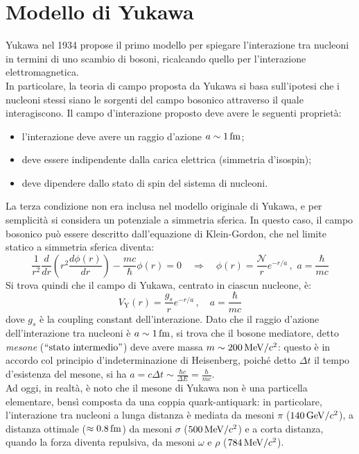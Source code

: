 
\section{Modello di Yukawa}

Yukawa nel 1934 propose il primo modello per spiegare l'interazione tra nucleoni in termini di uno scambio di bosoni, ricalcando quello per l'interazione elettromagnetica.\\
In particolare, la teoria di campo proposta da Yukawa si basa sull'ipotesi che i nucleoni stessi siano le sorgenti del campo bosonico attraverso il quale interagiscono. Il campo d'interazione proposto deve avere le seguenti proprietà:
\begin{itemize}
	\item l'interazione deve avere un raggio d'azione $ a \sim 1\,\mathrm{fm} $;
	\item deve essere indipendente dalla carica elettrica (simmetria d'isospin);
	\item deve dipendere dallo stato di spin del sistema di nucleoni.
\end{itemize}
La terza condizione non era inclusa nel modello originale di Yukawa, e per semplicità si considera un potenziale a simmetria sferica. In questo caso, il campo bosonico può essere descritto dall'equazione di Klein-Gordon, che nel limite statico a simmetria sferica diventa:
\begin{equation*}
	\frac{1}{r^2} \frac{d}{dr} \left( r^2 \frac{d\phi(r)}{dr} \right) - \frac{mc}{\hbar} \phi(r) = 0
	\quad \Rightarrow \quad
	\phi(r) = \frac{\mathcal{N}}{r} e^{- r / a}\,,\,\, a = \frac{\hbar}{mc}
\end{equation*}
Si trova quindi che il campo di Yukawa, centrato in ciascun nucleone, è:
\begin{equation}
	V_{\text{Y}}(r) = \frac{g_s}{r} e^{-r / a}\,,\quad a = \frac{\hbar}{mc}
	\label{eq:9.1}
\end{equation}
dove $ g_s $ è la coupling constant dell'interazione. Dato che il raggio d'azione dell'interazione tra nucleoni è $ a \sim 1\,\mathrm{fm} $, si trova che il bosone mediatore, detto \textit{mesone} ($ ``\text{stato intermedio}" $) deve avere massa $ m \sim 200\,\mathrm{MeV}/c^2 $: questo è in accordo col principio d'indeterminazione di Heisenberg, poiché detto $ \Delta t $ il tempo d'esistenza del mesone, si ha $ a = c \Delta t \sim \frac{\hbar c}{\Delta E} = \frac{\hbar}{mc} $.\\
Ad oggi, in realtà, è noto che il mesone di Yukawa non è una particella elementare, bensì composta da una coppia quark-antiquark: in particolare, l'interazione tra nucleoni a lunga distanza è mediata da mesoni $ \pi $ ($ 140\,\mathrm{GeV}/c^2 $), a distanza ottimale ($ \approx 0.8\,\mathrm{fm} $) da mesoni $ \sigma $ ($ 500\,\mathrm{MeV}/c^2 $) e a corta distanza, quando la forza diventa repulsiva, da mesoni $ \omega $ e $ \rho $ ($ 784\,\mathrm{MeV}/c^2 $).\\
